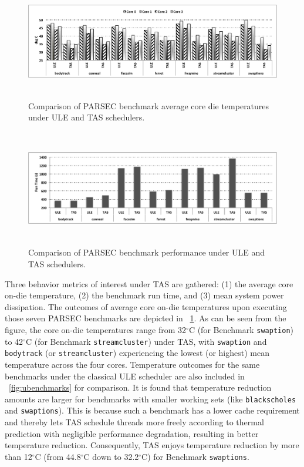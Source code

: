 \documentclass[times, 10pt,twocolumn]{IEEEtran}
\begin{document}
\begin{figure}[tbp] 
\centering
  \includegraphics[width=1.0\linewidth,height=2in]{graphics/parsectemp}
  \caption{Comparison of PARSEC benchmark average core die temperatures
under ULE and TAS schedulers.}
  \label{fig:pbenchmarkt}
\end{figure}
\begin{figure}[tbp]
  \includegraphics[width=1.0\linewidth,height=2in]{graphics/parsecperformance}
  \caption{Comparison of PARSEC benchmark performance under ULE and TAS
schedulers.}
  \label{fig:pbenchmarkp}
\end{figure} 
Three behavior metrics of interest under TAS are gathered: (1) the
average core on-die temperature, (2) the benchmark run time, and (3)
mean system power dissipation.  The outcomes of average core on-die
temperatures upon executing those seven PARSEC benchmarks are depicted
in \figurename~\ref{fig:pbenchmarkt}.  As can be seen from the figure,
the core on-die temperatures range from 32$^\circ$C (for Benchmark
\texttt{swaption}) to 42$^\circ$C (for Benchmark \texttt{streamcluster})
under TAS, with \texttt{swaption} and \texttt{bodytrack} (or
\texttt{streamcluster}) experiencing the lowest (or highest) mean
temperature across the four cores.  Temperature outcomes for the same
benchmarks under the classical ULE scheduler are also included in
\figurename~\ref{fig:ubenchmarks} for comparison.  It is found that
temperature reduction amounts are larger for benchmarks with smaller
working sets (like \texttt{blackscholes} and \texttt{swaptions}).  This is
because such a benchmark has a lower cache requirement \cite{Bienia2011}
and thereby lets TAS schedule threads more freely according to thermal
prediction with negligible performance degradation, resulting in better
temperature reduction.  Consequently, TAS enjoys temperature reduction
by more than 12$^{\circ}$C (from 44.8$^{\circ}$C down to
32.2$^{\circ}$C) for Benchmark \texttt{swaptions}.
  
\end{document}
